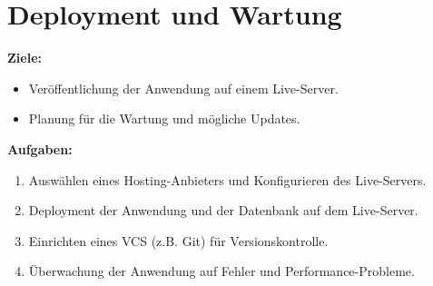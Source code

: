 \documentclass{article}
\begin{document}
	\section{Deployment und Wartung}
	\textbf{Ziele:}
	\begin{itemize}
		\item Veröffentlichung der Anwendung auf einem Live-Server.
		\item Planung für die Wartung und mögliche Updates.
	\end{itemize}
	\textbf{Aufgaben:}
	\begin{enumerate}
		\item Auswählen eines Hosting-Anbieters und Konfigurieren des Live-Servers.
		\item Deployment der Anwendung und der Datenbank auf dem Live-Server.
		\item Einrichten eines VCS (z.B. Git) für Versionskontrolle.
		\item Überwachung der Anwendung auf Fehler und Performance-Probleme.
	\end{enumerate}
\end{document}
